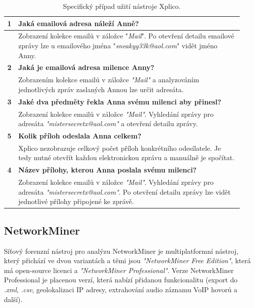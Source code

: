 \begin{center}
\begin{table}[ht]
    \centering
    \def\arraystretch{1.5}
    \begin{tabular}{| p{0.02\linewidth} | p{0.93\linewidth} |}
    \hline
        \textbf{1}   & \textbf{Jaká emailová adresa náleží Anně?} \\ \hline
            & Zobrazení kolekce emailů v záložce "\textit{Mail}". Po otevření detailu emailové zprávy lze u emailového jména "\textit{sneakyg33k@aol.com}" vidět jméno Anny. \\ \hline
            
        \textbf{2}   & \textbf{Jaká je emailová adresa milence Anny?} \\ \hline
            & Zobrazením kolekce emailů v záložce \textit{"Mail"} a analyzováním jednotlivých zpráv zaslaných Annou lze určit adresáta. \\ \hline

        \textbf{3}   & \textbf{Jaké dva předměty řekla Anna svému milenci aby přinesl?} \\ \hline
            & Zobrazení kolekce emailů v záložce \textit{"Mail"}. Vyhledání zprávy pro adresáta \textit{"mistersecretx@aol.com"} a otevření detailu zprávy. \\ \hline

        \textbf{5}   & \textbf{ Kolik příloh odeslala Anna celkem?} \\ \hline
            & Xplico nezobrazuje celkový počet příloh konkrétního odesílatele. Je tedy nutné otevřít každou elektronickou zprávu a manuálně je spočítat. \\ \hline
            
        \textbf{4}   & \textbf{Název přílohy, kterou Anna poslala svému milenci?} \\ \hline
            & Zobrazení kolekce emailů v záložce \textit{"Mail"}. Vyhledání zprávy pro adresáta \textit{"mistersecretx@aol.com"}. Po otevření detailu zprávy lze vidět jednotlivé přílohy připojené ke zprávě. \\ \hline

    \end{tabular}
    \caption{Specifický případ užití nástroje Xplico.}
    \label{tab:XplicoSpecialUseCase}
\end{table}
\end{center}
                    
    \subsection{NetworkMiner}   
        Síťový forenzní nástroj pro analýzu NetworkMiner je multiplatformní nástroj, který přichází ve dvou variantách a těmi jsou \textit{"NetworkMiner Free Edition"}, která má open-source licenci a \textit{"NetworkMiner Professional"}. Verze NetworkMiner Professional je placenou verzí, která nabízí přidanou funkcionalitu (export do \textit{.xml}, \textit{.csv}, geolokalizaci IP adresy, extrahování audio záznamu VoIP hovorů a další).

